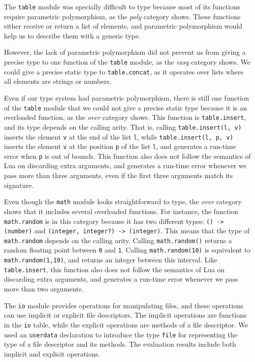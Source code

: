 The \texttt{table} module was specially difficult to type because
most of its functions require parametric polymorphism,
as the \emph{poly} category shows.
These functions either receive or return a list of elements, and
parametric polymorphism would help us to describe them with a generic type.

However, the lack of parametric polymorphism did not prevent us from
giving a precise type to one function of the \texttt{table} module,
as the \emph{easy} category shows.
We could give a precise static type to \texttt{table.concat},
as it operates over lists where all elements are strings or numbers.

Even if our type system had parametric polymorphism, there is
still one function of the \texttt{table} module that we could
not give a precise static type because it is an overloaded function,
as the \emph{over} category shows.
This function is \texttt{table.insert}, and its type depends on
the calling arity.
That is, calling \texttt{table.insert(l, v)} inserts the
element \texttt{v} at the end of the list \texttt{l},
while \texttt{table.insert(l, p, v)} inserts the element \texttt{v}
at the position \texttt{p} of the list \texttt{l},
and generates a run-time error when \texttt{p} is out of bounds.
This function also does not follow the semantics of Lua on
discarding extra arguments, and generates a run-time error whenever
we pass more than three arguments, even if the first three arguments
match its signature.

Even though the \texttt{math} module looks straightforward to type,
the \emph{over} category shows that it includes several overloaded functions.
For instance, the function \texttt{math.random} is in this category
because it has two different types:
\texttt{() -> (number)} and \texttt{(integer, integer?) -> (integer)}.
This means that the type of \texttt{math.random} depends on the calling arity.
Calling \texttt{math.random()} returns a random floating point
between \texttt{0} and \texttt{1}.
Calling \texttt{math.random(10)} is equivalent to \texttt{math.random(1,10)},
and returns an integer between this interval.
Like \texttt{table.insert}, this function also does not follow the
semantics of Lua on discarding extra arguments,
and generates a run-time error whenever we pass more than two arguments.

The \texttt{io} module provides operations for manipulating files,
and these operations can use implicit or explicit file descriptors.
The implicit operations are functions in the \texttt{io} table,
while the explicit operations are methods of a file descriptor.
We used an \texttt{userdata} declaration to introduce the type
\texttt{file} for representing the type of a file descriptor
and its methods.
The evaluation results include both implicit and explicit operations.

